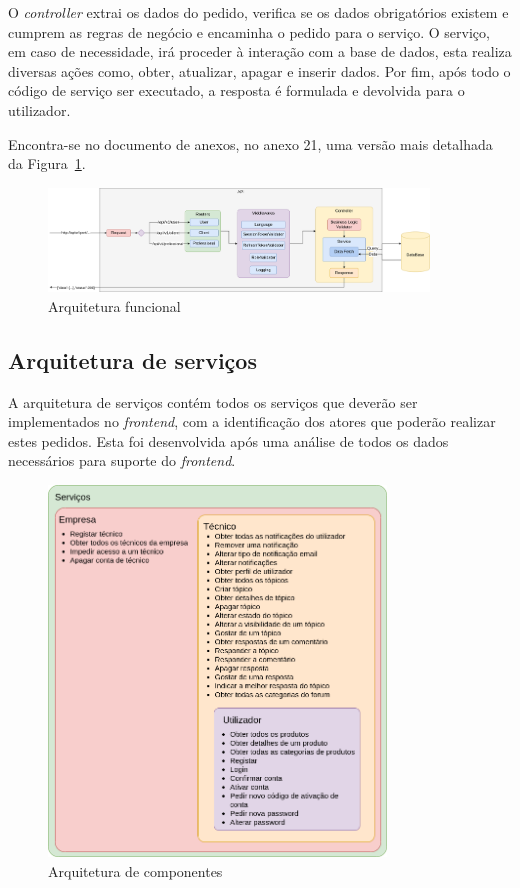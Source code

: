 O \textit{controller} extrai os dados do pedido, verifica se os dados obrigatórios existem e cumprem as regras de negócio e encaminha o pedido para o serviço. O serviço, em caso de necessidade, irá proceder à interação com a base de dados, esta realiza diversas ações como, obter, atualizar, apagar e inserir dados. Por fim, após todo o código de serviço ser executado, a resposta é formulada e devolvida para o utilizador.

Encontra-se no documento de anexos, no anexo 21, uma versão mais detalhada da Figura~\ref*{fig:47}.

\begin{figure}[htb]
  \centering
  \includegraphics[width=0.9\textwidth]{images/Arquiteturas/arquitetura_funcional.png}
  \caption{Arquitetura funcional}
  \label{fig:47}
\end{figure}

\newpage

\subsection{Arquitetura de serviços}
A arquitetura de serviços contém todos os serviços que deverão ser implementados no \textit{frontend}, com a identificação dos atores que poderão realizar estes pedidos. Esta foi desenvolvida após uma análise de todos os dados necessários para suporte do \textit{frontend}.

\begin{figure}[htb]
  \centering
  \includegraphics[width=0.8\textwidth]{images/Arquiteturas/arquitetura_de_componentes_final.png}
  \caption{Arquitetura de componentes}
  \label{fig:48}
\end{figure}

